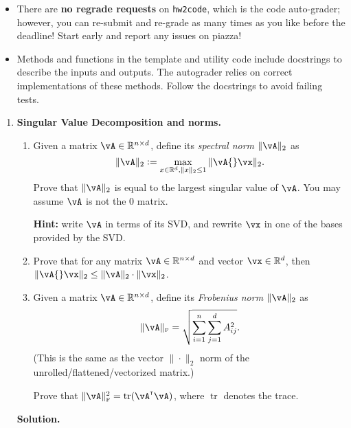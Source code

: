 \documentclass{article}
\def\R{\mathbb{R}}
\def\tF{{\scriptscriptstyle\textup{F}}}
\DeclareMathOperator{\tr}{tr}
\newcommand\T{{\scriptscriptstyle\mathsf{T}}}
\theoremstyle{definition}
\theoremstyle{remark}
\newenvironment{Q}
        {%
            \clearpage
        \item
            }
        {%
            \phantom{s}
          \bigskip
          \textbf{Solution.}
        }
\begin{document}
\begin{itemize}
            \item
              There are \textbf{no regrade requests} on \texttt{hw2code}, which is the code auto-grader;
              however, you can re-submit and re-grade as many times as you like before the deadline!
              Start early and report any issues on piazza!

            \item
                Methods and functions in the template and utility code include
                docstrings to describe the inputs and outputs.  The autograder
                relies on correct implementations of these methods.  Follow the
                docstrings to avoid failing tests.


        \end{itemize}
        \begin{enumerate}
                \begin{Q}
                    \textbf{Singular Value Decomposition and norms.}
                    \begin{enumerate}
                        \item
                            Given a matrix $\vA\in\R^{n\times d}$, define its \emph{spectral norm} $\|\vA\|_2$ as
                            \[
                                \|\vA\|_2 := \max_{x\in\R^d,\|x\|_2\le1} \|\vA{}\vx\|_2.
                            \]
                        Prove that $\|\vA\|_2$ is equal to the largest singular value of $\vA$.  You may assume $\vA$ is not the 0 matrix.

                            \textbf{Hint:} write $\vA$ in terms of its SVD, and rewrite $\vx$ in one of the bases provided by the SVD.

                        \item
                            Prove that for any matrix $\vA\in\R^{n\times d}$ and vector $\vx\in\R^d$, then
                            $\|\vA{}\vx\|_2 \leq \|\vA\|_2 \cdot \|\vx\|_2$.

                        \item
                            Given a matrix $\vA\in\R^{n\times d}$, define its \emph{Frobenius norm} $\|\vA\|_2$ as
                            \[
                                \|\vA\|_\tF = \sqrt{\sum_{i=1}^n\sum_{j=1}^d A_{ij}^2}.
                            \]
                        (This is the same as the vector $\|\cdot\|_2$ norm of the unrolled/flattened/vectorized matrix.)

                            Prove that $\|\vA\|_\tF^2 = \tr(\vA^\T\vA)$, where $\tr$ denotes the trace.


\end{enumerate}
\end{Q}
\end{enumerate}
\end{document}
